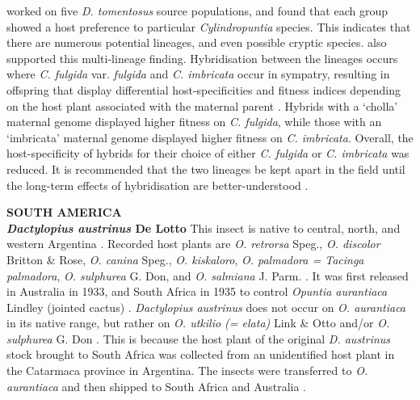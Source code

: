\citet{Mathenge2009} worked on five \textit{D. tomentosus} source populations, and found that each group showed a host preference to particular \textit{Cylindropuntia} species. This indicates that there are numerous potential lineages, and even possible cryptic species. \citet{Jones2015} also supported this multi-lineage finding. Hybridisation between the lineages occurs where \textit{C. fulgida} var. \textit{fulgida} and \textit{C. imbricata} occur in sympatry, resulting in offspring that display differential host-specificities and fitness indices depending on the host plant associated with the maternal parent \citep{Mathenge2010}. Hybrids with a `cholla' maternal genome displayed higher fitness on \textit{C. fulgida}, while those with an `imbricata' maternal genome displayed higher fitness on \textit{C. imbricata}. Overall, the host-specificity of hybrids for their choice of either \textit{C. fulgida} or \textit{C. imbricata} was reduced. It is recommended that the two lineages be kept apart in the field until the long-term effects of hybridisation are better-understood \citep{Paterson2011BiologicalAfrica}. \newline  

\noindent \textbf{SOUTH AMERICA}  \\

\noindent \textbf{\textit{Dactylopius austrinus} De Lotto} \newline 
This insect is native to central, north, and western Argentina \citep{DeLotto1974, gunn1979, zimmermann1981JointedCactus}. Recorded host plants are \textit{O. retrorsa} Speg., \textit{O. discolor} Britton \& Rose, \textit{O. canina} Speg., \textit{O. kiskaloro}, \textit{O. palmadora = Tacinga palmadora}, \textit{O. sulphurea} G. Don, and \textit{O. salmiana} J. Parm. \citep{Moran1979}. It was first released in Australia in 1933, and South Africa in 1935 to control \textit{Opuntia aurantiaca} Lindley (jointed cactus) \citep{Moran1991BiologicalAfrica,Perez-Guerra1992}. \textit{Dactylopius austrinus} does not occur on \textit{O. aurantiaca} in its native range, but rather on \textit{O. utkilio (= elata)} Link \& Otto and/or \textit{O. sulphurea} G. Don \citep{Moran1979, Moran1991BiologicalAfrica}. This is because the host plant of the original \textit{D. austrinus} stock brought to South Africa was collected from an unidentified host plant in the Catarmaca province in Argentina. The insects were transferred to \textit{O. aurantiaca} and then shipped to South Africa and Australia \citep{gunn1979}. \newline 

